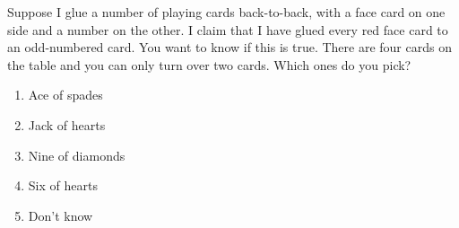 \documentclass[12pt,a4paper]{report}
\begin{document}
\begin{appendices}
Suppose I glue a number of playing cards back-to-back, with a face card on one side and a number on the other. I claim that I have glued every red face card to an odd-numbered card. You want to know if this is true. There are four cards on the table and you can only turn over two cards. Which ones do you pick?
\begin{enumerate}
  \item Ace of spades
  \item Jack of hearts
  \item Nine of diamonds
  \item Six of hearts
  \item Don't know
\end{enumerate}
\FloatBarrier

\begin{table}[!bp]
  \centering


\end{table}
\end{appendices}
\end{document}

